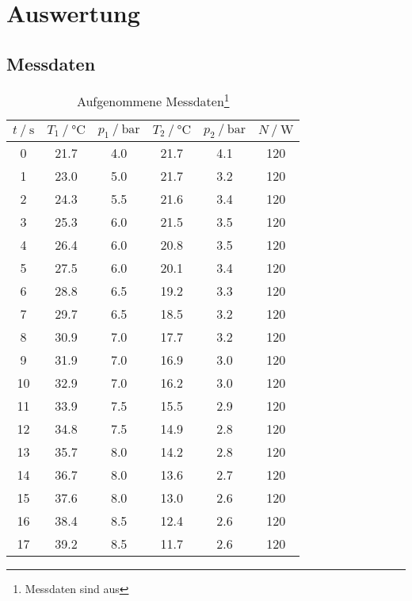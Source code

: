 \section{Auswertung}
\label{sec:Auswertung}
\subsection{Messdaten}
\begin{table}
  \centering
  \label{Aufgenommene Messdaten}
  \caption[Caption for LOF]{Aufgenommene Messdaten\footnote{Messdaten sind aus\cite{DatenundHinweise}}}
  \begin{tabular}{S[table-format = 2.0] S[table-format = 2.1] S[table-format = 2.2] S[table-format = 2.1]
     S[table-format = 1.1] S[table-format = 3.0]}
     \toprule
     {$t \mathbin{/} \si{\second}$} & {$T_1 \mathbin{/} \si{\celsius}$} & {$p_1 \mathbin{/} \si{\bar}$} & {$T_2 \mathbin{/} \si{\celsius}$}
     & {$p_2 \mathbin{/} \si{\bar}$} & {$N \mathbin{/} \si{\watt}$} \\
     	& 21.7 &	4.0    &	21.7 & 4.1 & 120 \\
     1  & 23.0 &	5.0    &	21.7 & 3.2 & 120 \\
     2 	& 24.3 &	5.5    &	21.6 & 3.4 & 120 \\
     3 	& 25.3 &	6.0    &	21.5 & 3.5 & 120 \\
     4 	& 26.4 &	6.0    &	20.8 & 3.5 & 120 \\
     5 	& 27.5 &	6.0    &	20.1 & 3.4 & 120 \\
     6 	& 28.8 &	6.5    &	19.2 & 3.3 & 120 \\
     7 	& 29.7 &	6.5    &	18.5 & 3.2 & 120 \\
     8 	& 30.9 &	7.0    &	17.7 & 3.2 & 120 \\
     9 	& 31.9 &	7.0    &	16.9 & 3.0 & 120 \\
    10	& 32.9 &	7.0    &	16.2 & 3.0 & 120 \\
    11	& 33.9 &	7.5    &	15.5 & 2.9 & 120 \\
    12	& 34.8 &	7.5    &	14.9 & 2.8 & 120 \\
    13	& 35.7 &	8.0    &	14.2 & 2.8 & 120 \\
    14	& 36.7 &	8.0    &	13.6 & 2.7 & 120 \\
    15	& 37.6 &	8.0    &	13.0 & 2.6 & 120 \\
    16	& 38.4 &	8.5    &	12.4 & 2.6 & 120 \\
    17	& 39.2 &	8.5    &	11.7 & 2.6 & 120 \\

\end{tabular}
\end{table}
